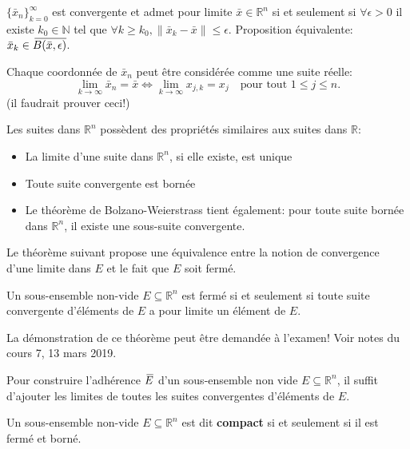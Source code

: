 \documentclass{report}
\newcommand*{\skol}[2][3]{{}\mkern#1mu\overline{\mkern-#1mu#2}} %
\newcommand*\adh[1]{\skol{#1}}
\newcommand*{\norm}[1]{\lVert#1\rVert}
\begin{document}
\begin{defn}
	$\{\bar x_n\}_{k=0}^\infty$ est convergente et admet pour limite $\bar x \in \mathbb R^n$ si et seulement si $\forall\epsilon > 0$ il existe $k_0 \in \mathbb N$ tel que $\forall k \geq k_0, \norm{\bar x_k - \bar x} \leq \epsilon$. Proposition équivalente: $\bar x_k \in \adh{B(\bar x, \epsilon)}$.
\end{defn}
\begin{remark}
	Chaque coordonnée de $\bar x_n$ peut être considérée comme une suite réelle:
	\begin{equation}
		\lim_{k \to \infty} \bar x_n = \bar x \iff \lim_{k \to \infty} x_{j, k} = x_j \quad \text{pour tout } 1 \leq j \leq n.
	\end{equation} (il faudrait prouver ceci!)
\end{remark}

\begin{thm}
	Les suites dans $\mathbb R^n$ possèdent des propriétés similaires aux suites dans $\mathbb R$:
	\begin{itemize}
		\item La limite d'une suite dans $\mathbb R^n$, si elle existe, est unique
		\item Toute suite convergente est bornée
		\item Le théorème de Bolzano-Weierstrass tient également: pour toute suite bornée dans $\mathbb R^n$, il existe une sous-suite convergente.
	\end{itemize}
\end{thm}

Le théorème suivant propose une équivalence entre la notion de convergence d'une limite dans $E$ et le fait que $E$ soit fermé.
\begin{thm}
	Un sous-ensemble non-vide $E \subseteq \mathbb R^n$ est fermé si et seulement si toute suite convergente d'éléments de $E$ a pour limite un élément de $E$.
\end{thm}
\begin{attention}
La démonstration de ce théorème peut être demandée à l'examen! Voir notes du cours 7, 13 mars 2019.
\end{attention}

\begin{thm}
	Pour construire l'adhérence $\adh E$ d'un sous-ensemble non vide $E \subseteq \mathbb R^n$, il suffit d'ajouter les limites de toutes les suites convergentes d'éléments de $E$.
\end{thm}

\begin{defn}
	Un sous-ensemble non-vide $E \subseteq \mathbb R^n$ est dit \textbf{compact} si et seulement si il est fermé et borné.
\end{defn}
\end{document}

